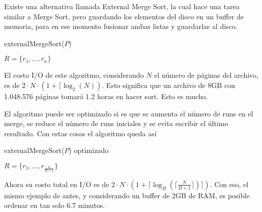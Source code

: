 Existe una alternativa llamada External Merge Sort, la cual hace una tarea similar a Merge Sort, pero guardando los elementos del disco en un buffer de memoria, para en ese momento fusionar ambas listas y guardarlas al disco.

\begin{algorithm}[h]
  \caption{externalMergeSort($P$)}
  $R = \{ r_1, \ldots, r_n \}$
\end{algorithm}

El costo I/O de este algoritmo, considerando $N$ el número de páginas del archivo, es de $2 \cdot N \cdot (1 + \lceil \log_2(N))$. Esto significa que un archivo de 8GB con 1.048.576 páginas tomará 1.2 horas en hacer sort. Esto es mucho.

El algoritmo puede ser optimizado si es que se aumenta el número de runs en el merge, se reduce el número de runs iniciales y se evita escribir el último resultado. Con estas cosas el algoritmo queda así
\pagebreak

\begin{algorithm}[h]
  \caption{externalMergeSort($P$) optimizado}
  $R = \{ r_1, \ldots, r_{\frac{n}{B+1}} \}$\;
\end{algorithm}

Ahora su costo total en I/O es de $2 \cdot N \cdot (1 + \lceil \log_B(\lceil \frac{N}{B+1} \rceil) \rceil)$. Con eso, el mismo ejemplo de antes, y considerando un buffer de 2GB de RAM, es posible ordenar en tan solo 6.7 minutos.

